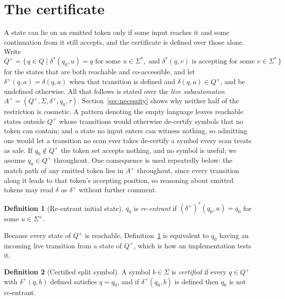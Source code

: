 \documentclass[11pt,a4paper]{article}
\theoremstyle{definition}
\newtheorem{definition}{Definition}
\theoremstyle{plain}
\begin{document}
\section{The certificate}
\label{sec:certificate}

A state can lie on an emitted token only if some input reaches it and some continuation from it still accepts, and the
certificate is defined over those alone. Write
\[
Q^+ = \{\, q \in Q \mid \delta^*(q_0, u) = q \text{ for some } u \in \Sigma^*, \text{ and } \delta^*(q, v) \text{ is
accepting for some } v \in \Sigma^* \,\}
\]
for the states that are both reachable and co-accessible, and let $\delta^+(q, a) = \delta(q, a)$ when that transition
is defined and $\delta(q, a) \in Q^+$, and be undefined otherwise. All that follows is stated over the \emph{live
subautomaton} $A^+ = (Q^+, \Sigma, \delta^+, q_0, \tau)$. Section~\ref{sec:necessity} shows why neither half of the
restriction is cosmetic. A pattern denoting the empty language leaves reachable states outside $Q^+$ whose transitions
would otherwise de-certify symbols that no token can contain; and a state no input enters can witness nothing, so
admitting one would let a transition no scan ever takes de-certify a symbol every scan treats as safe. If $q_0 \notin
Q^+$ the token set accepts nothing, and no symbol is useful; we assume $q_0 \in Q^+$ throughout. One consequence is
used repeatedly below: the match path of any emitted token lies in $A^+$ throughout, since every transition along it
leads to that token's accepting position, so reasoning about emitted tokens may read $\delta$ as $\delta^+$ without
further comment.

\begin{definition}[Re-entrant initial state]
\label{def:reentrant}
$q_0$ is \emph{re-entrant} if $(\delta^+)^*(q_0, u) = q_0$ for some $u \in \Sigma^+$.
\end{definition}

Because every state of $Q^+$ is reachable, Definition~\ref{def:reentrant} is equivalent to $q_0$ having an incoming
live transition from a state of $Q^+$, which is how an implementation tests it.

\begin{definition}[Certified split symbol]
\label{def:certified}
A symbol $b \in \Sigma$ is \emph{certified} if every $q \in Q^+$ with $\delta^+(q, b)$ defined satisfies $q = q_0$,
and if $\delta^+(q_0, b)$ is defined then $q_0$ is not re-entrant.
\end{definition}
\end{document}
